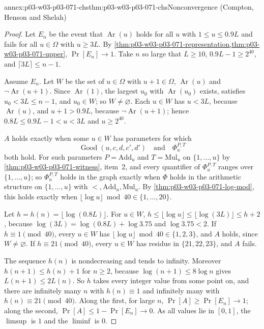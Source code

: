 \begin{annexitem}{annex:p03-w03-p03-071-chs}{thm:p03-w03-p03-071-chs}{Nonconvergence (Compton, Henson and Shelah)}
\begin{proof}
Let \(E_n\) be the event that \(\operatorname{Ar}(u)\) holds for all \(u\)
with \(1\leq u\leq0.9L\) and fails for all \(u\in\Omega\) with \(u\geq3L\).
By \cref{thm:p03-w03-p03-071-representation,thm:p03-w03-p03-071-upper},
\(\Pr[E_n]\to1\).  Take \(n\) so large that \(L\geq10\),
\(0.9L-1\geq2^{40}\), and \(\lceil3L\rceil\leq n-1\).

Assume \(E_n\).  Let \(W\) be the set of \(u\in\Omega\) with \(u+1\in\Omega\),
\(\operatorname{Ar}(u)\) and \(\neg\operatorname{Ar}(u+1)\).  Since
\(\operatorname{Ar}(1)\), the largest \(u_0\) with \(\operatorname{Ar}(u_0)\)
exists, satisfies \(u_0<3L\leq n-1\), and \(u_0\in W\); so \(W\neq
\varnothing\).  Each \(u\in W\) has \(u<3L\), because
\(\operatorname{Ar}(u)\), and \(u+1>0.9L\), because
\(\neg\operatorname{Ar}(u+1)\); hence \(0.8L\leq0.9L-1<u<3L\) and
\(u\geq2^{40}\).

\(A\) holds exactly when some \(u\in W\) has parameters for which
\[
 \operatorname{Good}(u,c,d,c',d')\quad\text{and}\quad\Phi^{P,T}_u
\]
both hold.  For such parameters \(P=\mathrm{Add}_u\) and \(T=\mathrm{Mul}_u\) on
\(\{1,\ldots,u\}\) by \cref{thm:p03-w03-p03-071-witness}, item~2, and every
quantifier of \(\Phi^{P,T}_u\) ranges over \(\{1,\ldots,u\}\); so
\(\Phi^{P,T}_u\) holds in the graph exactly when \(\Phi\) holds in the
arithmetic structure on \(\{1,\ldots,u\}\) with
\(<,\mathrm{Add}_u,\mathrm{Mul}_u\).  By
\cref{thm:p03-w03-p03-071-log-mod}, this holds exactly when
\(\lfloor\log u\rfloor\bmod40\in\{1,\ldots,20\}\).

Let \(h=h(n)=\lfloor\log(0.8L)\rfloor\).  For \(u\in W\),
\(h\leq\lfloor\log u\rfloor\leq\lfloor\log(3L)\rfloor\leq h+2\), because
\(\log(3L)=\log(0.8L)+\log3.75\) and \(\log3.75<2\).  If \(h\equiv1\pmod
{40}\), every \(u\in W\) has \(\lfloor\log u\rfloor\bmod40\in\{1,2,3\}\),
and \(A\) holds, since \(W\neq\varnothing\).  If \(h\equiv21\pmod{40}\),
every \(u\in W\) has residue in \(\{21,22,23\}\), and \(A\) fails.

The sequence \(h(n)\) is nondecreasing and tends to infinity.  Moreover
\(h(n+1)\leq h(n)+1\) for \(n\geq2\), because \(\log(n+1)\leq8\log n\) gives
\(L(n+1)\leq2L(n)\).  So \(h\) takes every integer value from some point on,
and there are infinitely many \(n\) with \(h(n)\equiv1\) and infinitely many
with \(h(n)\equiv21\pmod{40}\).  Along the first, for large \(n\),
\(\Pr[A]\geq\Pr[E_n]\to1\); along the second,
\(\Pr[A]\leq1-\Pr[E_n]\to0\).  As all values lie in \([0,1]\), the
\(\limsup\) is \(1\) and the \(\liminf\) is \(0\).
\end{proof}
\end{annexitem}

